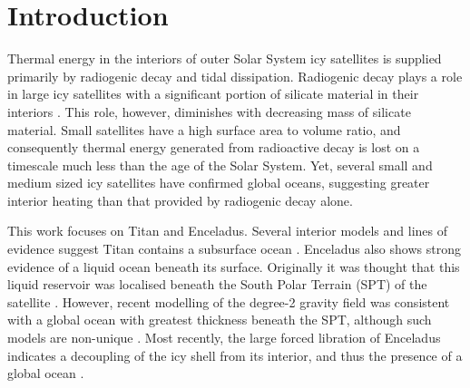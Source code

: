 \newpage
\section{Introduction}


Thermal energy in the interiors of outer Solar System icy satellites is supplied primarily by radiogenic decay and tidal dissipation. Radiogenic decay plays a role in large icy satellites with a significant portion of silicate material in their interiors \citep{hussmann2006subsurface}. This role, however, diminishes with decreasing mass of silicate material. Small satellites have a high surface area to volume ratio, and consequently thermal energy generated from radioactive decay is lost on a timescale much less than the age of the Solar System. Yet, several small and medium sized icy satellites have confirmed global oceans, suggesting greater interior heating than that provided by radiogenic decay alone.


This work focuses on Titan and Enceladus. Several interior models and lines of evidence suggest Titan contains a subsurface ocean \citep{sohl2003interior, bills2011rotational, iess2012tides, baland2014titan, mitri2014shape, sohl2014structural}. Enceladus also shows strong evidence of a liquid ocean beneath its surface. Originally it was thought that this liquid reservoir was localised beneath the South Polar Terrain (SPT) of the satellite \citep[e.g.,][]{collins2007enceladus}. However, recent modelling of the degree-2 gravity field was consistent with a global ocean with greatest thickness beneath the SPT, although such models are non-unique \citep{iess2014gravity,mckinnon2015effect}. Most recently, the large forced libration of Enceladus indicates a decoupling of the icy shell from its interior, and thus the presence of a global ocean \citep{thomas2016enceladus}.  


